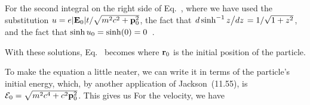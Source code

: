 {	For the second integral on the right side of Eq.~,
	where we have used the substitution $u = e \abs{\vb{E}_0} t / \sqrt{m^2 c^2 + \vb{p}_0^2}$, the fact that $\dv*{\sinh^{-1} z}{z} = 1 / \sqrt{1 + z^2}$, and the fact that $\sinh u_0 = \sinh(0) = 0$~\cite{Arcsinh}.
	
	With these solutions, Eq.~ becomes
	where $\vb{r}_0$ is the initial position of the particle.
	
	To make the equation a little neater, we can write it in terms of the particle's initial energy, which, by another application of Jackson~(11.55), is $\mathcal{E}_0 = \sqrt{m^2 c^4 + c^2 \vb{p}_0^2}$.  This gives us
	For the velocity, we have
	\vfix
}

%
%


